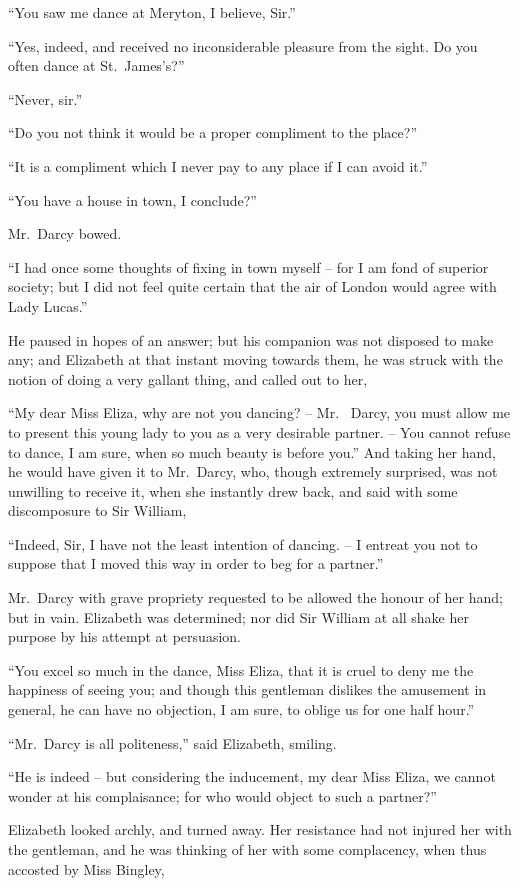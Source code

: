 “You saw me dance at Meryton, I believe, Sir.”

“Yes, indeed, and received no inconsiderable pleasure
from the sight. Do you often dance at St.\ James’s?”

“Never, sir.”

“Do you not think it would be a proper compliment to
the place?”

“It is a compliment which I never pay to any place
if I can avoid it.”

“You have a house in town, I conclude?”

Mr.\ Darcy bowed.

“I had once some thoughts of fixing in town myself -- for
I am fond of superior society; but I did not feel
quite certain that the air of London would agree with
Lady Lucas.”

He paused in hopes of an answer; but his companion
was not disposed to make any; and Elizabeth at that
instant moving towards them, he was struck with the
notion of doing a very gallant thing, and called out to her,

“My dear Miss Eliza, why are not you dancing? -- Mr.\ %
Darcy, you must allow me to present this young lady
to you as a very desirable partner. -- You cannot refuse
to dance, I am sure, when so much beauty is before you.”
And taking her hand, he would have given it to Mr.\ Darcy,
who, though extremely surprised, was not unwilling to
receive it, when she instantly drew back, and said with
some discomposure to Sir William,

“Indeed, Sir, I have not the least intention of dancing. --
I entreat you not to suppose that I moved this way in
order to beg for a partner.”

Mr.\ Darcy with grave propriety requested to be allowed
the honour of her hand; but in vain. Elizabeth was determined;
nor did Sir William at all shake her purpose by his
attempt at persuasion.

“You excel so much in the dance, Miss Eliza, that it is
cruel to deny me the happiness of seeing you; and though
this gentleman dislikes the amusement in general, he can
have no objection, I am sure, to oblige us for one half hour.”

“Mr.\ Darcy is all politeness,” said Elizabeth, smiling.

“He is indeed -- but considering the inducement, my
dear Miss Eliza, we cannot wonder at his complaisance;
for who would object to such a partner?”

Elizabeth looked archly, and turned away. Her
resistance had not injured her with the gentleman, and
he was thinking of her with some complacency, when thus
accosted by Miss Bingley,

